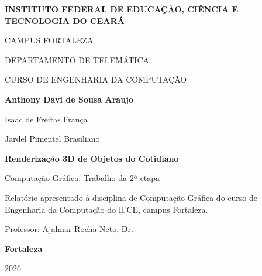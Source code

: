 \begin{titlepage}
  \thispagestyle{empty}
  \centering
  \singlespacing

  {\bfseries INSTITUTO FEDERAL DE EDUCAÇÃO, CIÊNCIA E TECNOLOGIA DO CEARÁ\par
  CAMPUS FORTALEZA\par
  DEPARTAMENTO DE TELEMÁTICA\par
  CURSO DE ENGENHARIA DA COMPUTAÇÃO\par}

  \vspace{1.5cm}

  {\bfseries Anthony Davi de Sousa Araujo\par
  Isaac de Freitas França\par
  Jardel Pimentel Brasiliano\par}

  \vfill

  {\fontsize{16}{19}\selectfont\bfseries Renderização 3D de Objetos do Cotidiano\par}
  \vspace{6pt}
  {\large Computação Gráfica: Trabalho da 2ª etapa\par}

  \vfill

  \begin{flushright}
    \begin{minipage}{0.5\textwidth}
      \small\raggedright
      Relatório apresentado à disciplina de Computação Gráfica do curso de Engenharia da Computação do IFCE, campus Fortaleza.\par
      \vspace{6pt}
      Professor: Ajalmar Rocha Neto, Dr.
    \end{minipage}
  \end{flushright}

  \vfill

  {\bfseries Fortaleza\par
  2026\par}
\end{titlepage}

\clearpage
